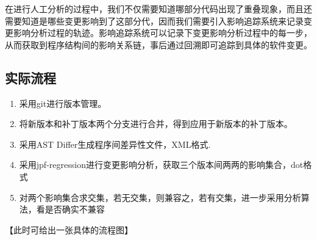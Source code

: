 在进行人工分析的过程中，我们不仅需要知道哪部分代码出现了重叠现象，而且还需要知道是哪些变更影响到了这部分代，因而我们需要引入影响追踪系统来记录变更影响分析过程的轨迹。影响追踪系统可以记录下变更影响分析过程中的每一步，从而获取到程序结构间的影响关系链，事后通过回溯即可追踪到具体的软件变更。

\subsection{实际流程}

	\begin{enumerate}
		\item 采用git进行版本管理。
		\item 将新版本和补丁版本两个分支进行合并，得到应用于新版本的补丁版本。
		\item 采用AST Differ生成程序间差异性文件，XML格式.
		\item 采用jpf-regression进行变更影响分析，获取三个版本间两两的影响集合，dot格式
		\item 对两个影响集合求交集，若无交集，则兼容之，若有交集，进一步采用分析算法，看是否确实不兼容
	\end{enumerate}
	
	【此时可给出一张具体的流程图】
